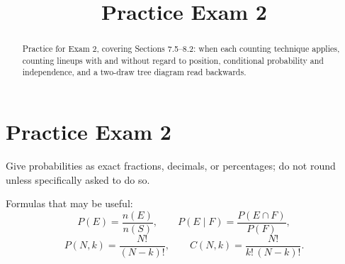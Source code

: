 \documentclass[12pt]{ximera}
\title{Practice Exam 2}
\begin{document}
\begin{abstract}
Practice for Exam 2, covering Sections 7.5--8.2: when each counting technique
applies, counting lineups with and without regard to position, conditional
probability and independence, and a two-draw tree diagram read backwards.
\end{abstract}
\maketitle

\section*{Practice Exam 2}

Give probabilities as exact fractions, decimals, or percentages; do not round unless
specifically asked to do so.

Formulas that may be useful:
\[
P(E)=\frac{n(E)}{n(S)}, \qquad P(E\mid F)=\frac{P(E\cap F)}{P(F)},
\]
\[
P(N,k)=\frac{N!}{(N-k)!}, \qquad C(N,k)=\frac{N!}{k!\,(N-k)!}.
\]
\end{document}
